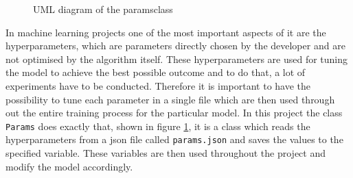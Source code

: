 \begin{figure}[htbp]
{
    }
	\caption{UML diagram of the \flqq params\frqq class}
	\label{fig:UML-Params}
\end{figure}
\noindent
In machine learning projects one of the most important aspects of it are the hyperparameters, which are parameters directly chosen by the developer and are not optimised by the algorithm itself. These hyperparameters are used for tuning the model to achieve the best possible outcome and to do that, a lot of experiments have to be conducted. Therefore it is important to have the possibility to tune each parameter in a single file which are then used through out the entire training process for the particular model. In this project the class \texttt{Params} does exactly that, shown in figure \ref{fig:UML-Params}, it is a class which reads the hyperparameters from a json file called \texttt{params.json} and saves the values to the specified variable. These variables are then used throughout the project and modify the model accordingly.

